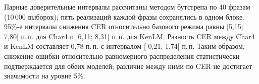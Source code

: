 Парные доверительные интервалы рассчитаны методом бутстрепа по 40 фразам (10\,000 выборок); пять реализаций каждой фразы сохранялись в одном блоке. 95\%-е интервалы снижения CER относительно базового режима равны [5,15; 7,80] п.\,п. для Char4 и [6,11; 8,31] п.\,п. для KenLM. Разность CER между Char4 и KenLM составляет 0,78 п.\,п. с интервалом [-0,21; 1,74] п.\,п. Таким образом, снижение ошибки относительно равномерного распределения статистически подтверждается для обеих моделей; различие между ними по CER не достигает значимости на уровне 5\%.
